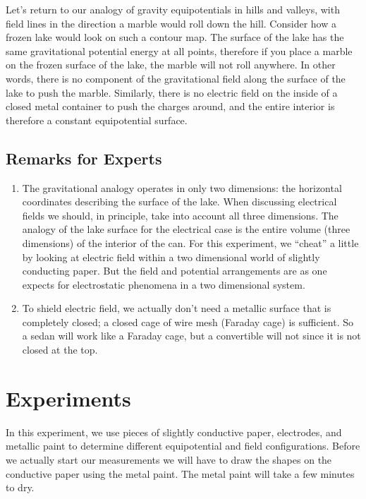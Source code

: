 Let's return to our analogy of gravity equipotentials in hills and valleys, with field lines in the direction a marble would roll down the hill. Consider how a frozen lake would look on such a contour map. The surface of the lake has the same gravitational potential energy at all points, therefore if you place a marble on the frozen surface of the lake, the marble will not roll anywhere. In other words, there is no component of the gravitational field along the surface of the lake to push the marble. Similarly, there is no electric field on the inside of a closed metal container to push the charges around, and the entire interior is therefore a constant equipotential surface.

\subsection{Remarks for Experts}

\begin{enumerate}
    \item  The gravitational analogy operates in only two dimensions: the horizontal coordinates describing the surface of the lake. When discussing electrical fields we should, in principle, take into account all three dimensions. The analogy of the lake surface for the electrical case is the entire volume (three dimensions) of the interior of the can. For this experiment, we ``cheat'' a little by looking at electric field within a two dimensional world of slightly conducting paper. But the field and potential arrangements are as one expects for electrostatic phenomena in a two dimensional system.
    \item To shield electric field, we actually don't need a metallic surface that is completely closed; a closed cage of wire mesh (Faraday cage) is sufficient. So a sedan will work like a Faraday cage, but a convertible will not since it is not closed at the top.
\end{enumerate}

\section{Experiments}

In this experiment, we use pieces of slightly conductive paper, electrodes, and metallic paint to determine different equipotential and field configurations. Before we actually start our measurements we will have to draw the shapes on the conductive paper using the metal paint. The metal paint will take a few minutes to dry.

